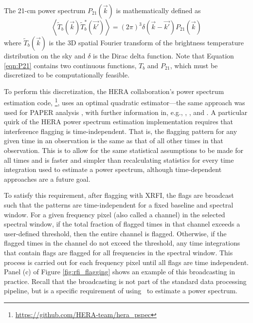 \documentclass[12pt]{article}
\begin{document}
The 21-cm power spectrum $P_{21}\left(\vec{k}\right)$ is mathematically defined as
\begin{equation}
\left\langle \widetilde{T}_b\left(\vec{k}\right) \widetilde{T}_b^*\left(\vec{k'}\right) \right\rangle = \left(2\pi\right)^3 \delta\left(\vec{k} - \vec{k'}\right) P_{21}\left(\vec{k}\right)
\label{eqn:P21}
\end{equation}
where $\widetilde{T}_b\left(\vec{k}\right)$ is the 3D spatial Fourier transform of the brightness temperature distribution on the sky and $\delta$ is the Dirac delta function. Note that Equation \ref{eqn:P21} contains two continuous functions, $T_b$ and $P_{21}$, which must be discretized to be computationally feasible.

To perform this discretization, the HERA collaboration's power spectrum estimation code, \herapspec\footnote{\url{https://github.com/HERA-team/hera_pspec}}, uses an optimal quadratic estimator---the same approach was used for PAPER analysis \citep{ali2015}, with further information in, e.g., \cite{tegmark1997}, \cite{tegmark1998}, and \cite{liu2011}. A particular quirk of the HERA power spectrum estimation implementation requires that interference flagging is time-independent. That is, the flagging pattern for any given time in an observation is the same as that of all other times in that observation. This is to allow for the same statistical assumptions to be made for all times and is faster and simpler than recalculating statistics for every time integration used to estimate a power spectrum, although time-dependent approaches are a future goal.

To satisfy this requirement, after flagging with XRFI, the flags are broadcast such that the patterns are time-independent for a fixed baseline and spectral window. For a given frequency pixel (also called a channel) in the selected spectral window, if the total fraction of flagged times in that channel exceeds a user-defined threshold, then the entire channel is flagged. Otherwise, if the flagged times in the channel do not exceed the threshold, any time integrations that contain flags are flagged for all frequencies in the spectral window. This process is carried out for each frequency pixel until all flags are time independent. Panel (c) of Figure \ref{fig:rfi_flagging} shows an example of this broadcasting in practice. Recall that the broadcasting is not part of the standard data processing pipeline, but is a specific requirement of using \herapspec~to estimate a power spectrum. \vspace{3mm}
\end{document}
